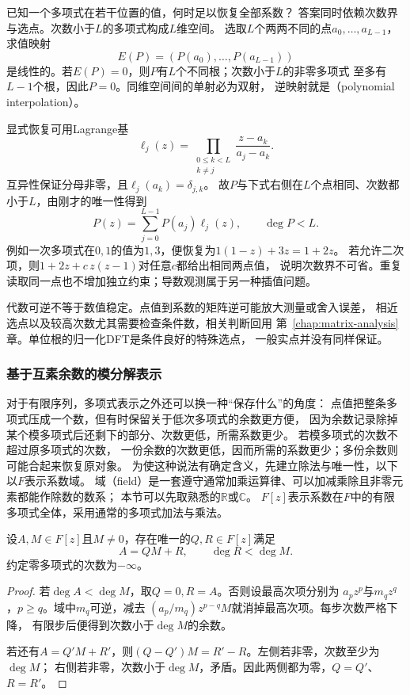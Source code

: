 已知一个多项式在若干位置的值，何时足以恢复全部系数？
答案同时依赖次数界与选点。次数小于$L$的多项式构成$L$维空间。
选取$L$个两两不同的点$a_0,\ldots,a_{L-1}$，求值映射
\[
  E(P)=(P(a_0),\ldots,P(a_{L-1}))
\]
是线性的。若$E(P)=0$，则$P$有$L$个不同根；次数小于$L$的非零多项式
至多有$L-1$个根，因此$P=0$。同维空间间的单射必为双射，
逆映射就是（polynomial interpolation）。

显式恢复可用Lagrange基
\[
  \ell_j(z)=\prod_{\substack{0\leq k<L\\k\neq j}}
  \frac{z-a_k}{a_j-a_k}.
\]
互异性保证分母非零，且$\ell_j(a_k)=\delta_{j,k}$。
故$P$与下式右侧在$L$个点相同、次数都小于$L$，由刚才的唯一性得到
\begin{equation}
  P(z)=\sum_{j=0}^{L-1}P(a_j)\ell_j(z),\qquad\deg P<L.
  \label{eq:signal-analysis-lagrange-interpolation}
\end{equation}
例如一次多项式在$0,1$的值为$1,3$，便恢复为$1(1-z)+3z=1+2z$。
若允许二次项，则$1+2z+c\,z(z-1)$对任意$c$都给出相同两点值，
说明次数界不可省。重复读取同一点也不增加独立约束；导数观测属于另一种插值问题。

代数可逆不等于数值稳定。点值到系数的矩阵逆可能放大测量或舍入误差，
相近选点以及较高次数尤其需要检查条件数，相关判断回用
第~\ref{chap:matrix-analysis}章。单位根的归一化DFT是条件良好的特殊选点，
一般实点并没有同样保证。

\subsubsection{基于互素余数的模分解表示}

对于有限序列，多项式表示之外还可以换一种“保存什么”的角度：
点值把整条多项式压成一个数，但有时保留关于低次多项式的余数更方便，
因为余数记录除掉某个模多项式后还剩下的部分、次数更低，所需系数更少。
若模多项式的次数不超过原多项式的次数，
一份余数的次数更低，因而所需的系数更少；多份余数则可能合起来恢复原对象。
为使这种说法有确定含义，先建立除法与唯一性，以下以$F$表示系数域。
域（field）是一套遵守通常加乘运算律、可以加减乘除且非零元素都能作除数的数系；
本节可以先取熟悉的$\mathbb R$或$\mathbb C$。
$F[z]$表示系数在$F$中的有限多项式全体，采用通常的多项式加法与乘法。
\begin{theorem}[多项式带余除法]
  \label{thm:signal-analysis-polynomial-division}
  设$A,M\in F[z]$且$M\neq0$，存在唯一的$Q,R\in F[z]$满足
  \[
    A=QM+R,\qquad\deg R<\deg M.
  \]
  约定零多项式的次数为$-\infty$。
\end{theorem}
\begin{proof}
  若$\deg A<\deg M$，取$Q=0,R=A$。否则设最高次项分别为
  $a_pz^p$与$m_qz^q$，$p\geq q$。域中$m_q$可逆，减去
  $(a_p/m_q)z^{p-q}M$就消掉最高次项。每步次数严格下降，
  有限步后便得到次数小于$\deg M$的余数。

  若还有$A=Q'M+R'$，则$(Q-Q')M=R'-R$。左侧若非零，次数至少为$\deg M$；
  右侧若非零，次数小于$\deg M$，矛盾。因此两侧都为零，$Q=Q'$、$R=R'$。
\end{proof}

